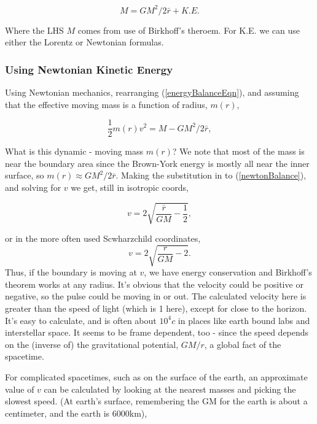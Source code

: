 \documentclass[../rzero]{subfiles}
\begin{document}
\begin{equation} \label{energyBalanceEqn}
 M = GM^2/2 \bar r + K.E.
\end{equation}

Where the LHS $M$ comes from use of Birkhoff's theroem. For K.E. we can use either the Lorentz or Newtonian formulas. 

\subsubsection{Using Newtonian Kinetic Energy}

Using Newtonian mechanics, rearranging (\ref{energyBalanceEqn}), and assuming that the effective moving mass is a function of radius, $m(r)$,

\begin{equation}\label{newtonBalance}
 \frac{1}{2}m(r)v^2 = M - GM^2/2 \bar r , 
\end{equation}

What is this dynamic - moving mass $ m(r) $? We note that most of the mass is near the boundary area since the Brown-York energy is mostly all near the inner surface, so   $m(r) \approx GM^2/2 \bar r $. Making the substitution in to (\ref{newtonBalance}), and solving for $v$ we get, still in isotropic coords,

\begin{equation}
 v = 2 \sqrt{\frac{\bar r}{G M} - \frac{1}{2}},
\end{equation}

or in the more often used Scwharzchild coordinates,
\begin{equation}
 v = 2 \sqrt{\frac{r}{G M} - 2}.
\end{equation}
Thus, if the boundary is moving at $v$, we have energy conservation and Birkhoff's theorem works at any radius. It's obvious that the velocity could be positive or negative, so the pulse could be moving in or out. The calculated velocity here is greater than the speed of light (which is 1 here), except for close to the horizon. It's easy to calculate, and is often about $10^4c$ in places like earth bound labs and interstellar space. It seems to be frame dependent, too - since the speed depends on the (inverse of) the gravitational potential, $GM/r$, a global fact of the spacetime. 

For complicated spacetimes, such as on the surface of the earth, an approximate value of $v$ can be calculated by looking at the nearest masses and picking the slowest speed. (At earth's surface, remembering the GM for the earth is about a centimeter, and the earth is 6000km), 
\end{document}
